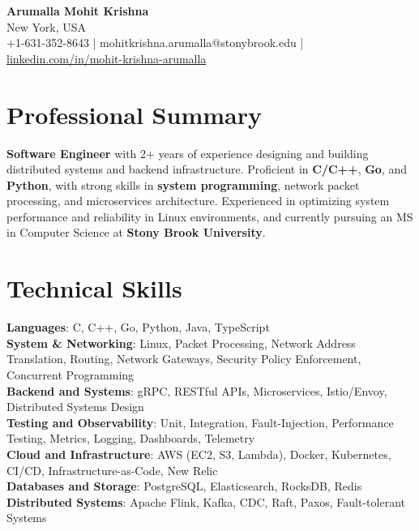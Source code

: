\documentclass[letterpaper,11pt]{article}
\begin{document}
\begin{center}
  {\Large \textbf{Arumalla Mohit Krishna}} \\
  New York, USA \\
  +1-631-352-8643 \enspace | \enspace mohitkrishna.arumalla@stonybrook.edu \enspace | \enspace \href{https://www.linkedin.com/in/mohit-krishna-arumalla}{linkedin.com/in/mohit-krishna-arumalla}
\end{center}

\section{Professional Summary}
  \begin{itemize}[leftmargin=0.15in, label={}]
    \small{\item{
     \textbf{Software Engineer} with 2+ years of experience designing and building distributed systems and backend infrastructure. Proficient in \textbf{C/C++}, \textbf{Go}, and \textbf{Python}, with strong skills in \textbf{system programming}, network packet processing, and microservices architecture. Experienced in optimizing system performance and reliability in Linux environments, and currently pursuing an MS in Computer Science at \textbf{Stony Brook University}.
    }}
  \end{itemize}
\vspace{-16pt}

\section{Technical Skills}
 \begin{itemize}[leftmargin=0.15in, label={}]
    \small{\item{
     \textbf{Languages}: C, C++, Go, Python, Java, TypeScript \\
     \textbf{System \& Networking}: Linux, Packet Processing, Network Address Translation, Routing, Network Gateways, Security Policy Enforcement, Concurrent Programming \\
     \textbf{Backend and Systems}: gRPC, RESTful APIs, Microservices, Istio/Envoy, Distributed Systems Design \\
     \textbf{Testing and Observability}: Unit, Integration, Fault-Injection, Performance Testing, Metrics, Logging, Dashboards, Telemetry \\
     \textbf{Cloud and Infrastructure}: AWS (EC2, S3, Lambda), Docker, Kubernetes, CI/CD, Infrastructure-as-Code, New Relic \\
     \textbf{Databases and Storage}: PostgreSQL, Elasticsearch, RocksDB, Redis \\
     \textbf{Distributed Systems}: Apache Flink, Kafka, CDC, Raft, Paxos, Fault-tolerant Systems
    }}
 \end{itemize}
\vspace{-16pt}
\end{document}

